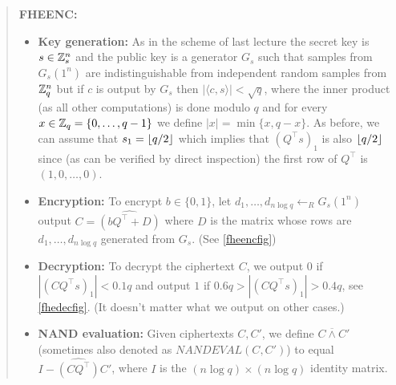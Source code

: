 \begin{quote}
\textbf{FHEENC:}

\begin{itemize}
\item
  \textbf{Key generation:} As in the scheme of last lecture the secret
  key is \(s\in{\mathbb{Z}}_s^n\) and the public key is a generator \(G_s\) such
  that samples from \(G_s(1^n)\) are indistinguishable from independent
  random samples from \({\mathbb{Z}}_q^n\) but if \(c\) is output by \(G_s\) then
  \(|\langle c,s \rangle|<\sqrt{q}\), where the inner product (as all
  other computations) is done modulo \(q\) and for every
  \(x\in{\mathbb{Z}}_q=\{0,\ldots,q-1\}\) we define \(|x|=\min \{ x, q-x \}\). As
  before, we can assume that \(s_1 = \lfloor q/2 \rfloor\) which implies that
  \((Q^\top s)_1\) is also \(\lfloor q/2 \rfloor\) since (as can be verified by
  direct inspection) the first row of \(Q^\top\) is \((1,0,\ldots,0)\).
\item
  \textbf{Encryption:} To encrypt \(b\in\{0,1\}\), let
  \(d_1,\ldots,d_{n\log q} \leftarrow_R G_s(1^n)\) output
  \(C=\widehat{(bQ^\top +D)}\) where \(D\) is the matrix whose rows are
  \(d_1,\ldots,d_{n\log q}\) generated from \(G_s\). (See
  \cref{fheencfig})
\item
  \textbf{Decryption:} To decrypt the ciphertext \(C\), we output \(0\)
  if \(|(\ensuremath{\mathit{CQ}}^\top s)_1|<0.1q\) and output \(1\) if
  \(0.6q>|(\ensuremath{\mathit{CQ}}^\top s)_1|>0.4q\), see
  \cref{fhedecfig}. (It doesn't matter what we output on other cases.)
\item
  \textbf{NAND evaluation:} Given ciphertexts \(C,C'\), we define
  \(C \overline{\wedge} C'\) (sometimes also denoted as
  \(\ensuremath{\mathit{NANDEVAL}}(C,C')\)) to equal
  \(I- \widehat{(\ensuremath{\mathit{CQ}}^\top)}C'\), where \(I\) is the
  \((n\log q)\times (n\log q)\) identity matrix.
\end{itemize}
\end{quote}

\hfill\break

\hfill\break


